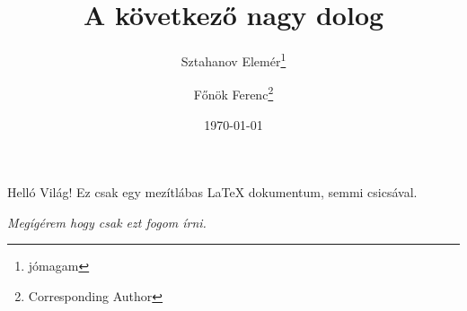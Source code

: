 \documentclass[12pt,a4paper]{article} %
\title{A következő nagy dolog}
\author{Sztahanov Elemér\thanks{jómagam} \and Főnök Ferenc\thanks{Corresponding Author}}
\date{\today}
\begin{document}
\maketitle

Helló Világ! Ez csak egy mezítlábas \LaTeX{} dokumentum, semmi csicsával.

\textit{Megígérem hogy csak ezt fogom írni.}
\end{document}
